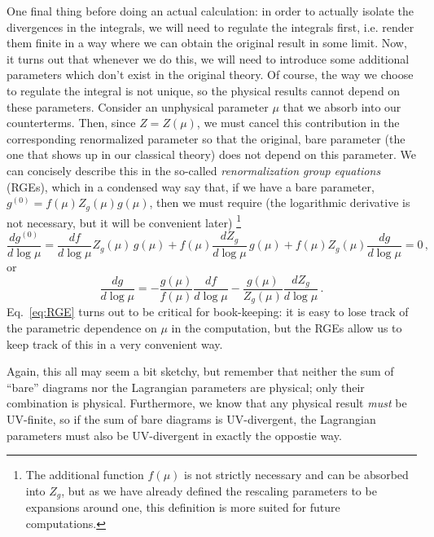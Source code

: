 \documentclass{article}
\numberwithin{equation}{subsection}
\begin{document}
One final thing before doing an actual calculation: in order to actually isolate the divergences in the integrals, we will need to regulate the integrals first, i.e. render them finite in a 
way where we can obtain the original result in some limit. Now, it turns out that whenever we do this, we will need to introduce some additional parameters which don't exist in the 
original theory. Of course, the way we choose to regulate the integral is not unique, so the physical results cannot depend on these parameters. Consider an unphysical parameter $\mu$ 
that we absorb into our counterterms. Then, since $Z = Z(\mu)$, we must cancel this contribution in the corresponding renormalized parameter so that the original, bare parameter 
(the one that shows up in our classical theory) does not depend on this parameter. We can concisely describe this in the so-called \textit{renormalization group equations} (RGEs), which in 
a condensed way say that, if we have a bare parameter, $g^{(0)} = f(\mu) Z_g(\mu) g(\mu)$, then we must require (the logarithmic derivative is not necessary, but it will be convenient later)
\footnote{The additional function $f(\mu)$ is not strictly necessary and can be absorbed into $Z_g$, but as we have already defined the rescaling parameters to be expansions around one, 
this definition is more suited for future computations.}
\begin{equation}
    \frac{d g^{(0)}}{d\log\mu} = \frac{df}{d\log\mu}Z_g(\mu)\,g(\mu) + f(\mu)\frac{dZ_g}{d\log\mu}\,g(\mu) + f(\mu) Z_g(\mu)\frac{dg}{d\log\mu} = 0\,,
\end{equation}
or
\begin{equation}\label{eq:RGE}
    \frac{dg}{d\log\mu} = -\frac{g(\mu)}{f(\mu)}\frac{df}{d\log\mu} - \frac{g(\mu)}{Z_g(\mu)}\frac{dZ_g}{d\log\mu}\,.
\end{equation}
Eq.~\eqref{eq:RGE} turns out to be critical for book-keeping: it is easy to lose track of the parametric dependence on $\mu$ in the computation, but the RGEs allow us to keep track 
of this in a very convenient way.

Again, this all may seem a bit sketchy, but remember that neither the sum of ``bare'' diagrams nor the Lagrangian parameters are physical; only their
combination is physical. Furthermore, we know that any physical result \textit{must} be UV-finite, so if the sum of bare diagrams is UV-divergent, the
Lagrangian parameters must also be UV-divergent in exactly the oppostie way.
\end{document}
